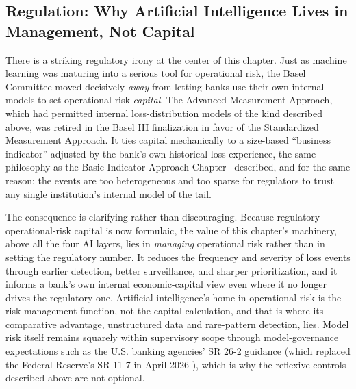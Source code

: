 \documentclass[../ai_in_finance]{subfiles}
\begin{document}
\subsection{Regulation: Why Artificial Intelligence Lives in Management, Not Capital}
\label{sec:oprisk-regulation}

There is a striking regulatory irony at the center of this chapter. Just as machine learning was maturing into a serious tool for operational risk, the Basel Committee moved decisively \emph{away} from letting banks use their own internal models to set operational-risk \emph{capital}. The Advanced Measurement Approach, which had permitted internal loss-distribution models of the kind described above, was retired in the Basel III finalization in favor of the Standardized Measurement Approach. It ties capital mechanically to a size-based ``business indicator'' adjusted by the bank's own historical loss experience, the same philosophy as the Basic Indicator Approach Chapter~ described, and for the same reason: the events are too heterogeneous and too sparse for regulators to trust any single institution's internal model of the tail.

The consequence is clarifying rather than discouraging. Because regulatory operational-risk capital is now formulaic, the value of this chapter's machinery, above all the four AI layers, lies in \emph{managing} operational risk rather than in setting the regulatory number. It reduces the frequency and severity of loss events through earlier detection, better surveillance, and sharper prioritization, and it informs a bank's own internal economic-capital view even where it no longer drives the regulatory one. Artificial intelligence's home in operational risk is the risk-management function, not the capital calculation, and that is where its comparative advantage, unstructured data and rare-pattern detection, lies. Model risk itself remains squarely within supervisory scope through model-governance expectations such as the U.S. banking agencies' SR 26-2 guidance (which replaced the Federal Reserve's SR 11-7 in April 2026 \parencite{frb2026revised}), which is why the reflexive controls described above are not optional.
\end{document}
